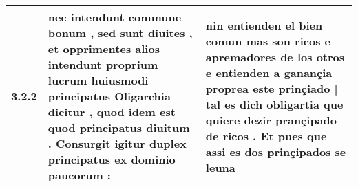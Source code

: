 \begin{tabular}{|p{1cm}|p{6.5cm}|p{6.5cm}|}

\hline
3.2.2 & nec intendunt commune bonum , sed sunt diuites , \textbf{ et opprimentes alios intendunt proprium lucrum huiusmodi principatus Oligarchia dicitur , } quod idem est quod principatus diuitum . Consurgit igitur duplex principatus ex dominio paucorum : & nin entienden el bien comun mas son ricos e apremadores de los otros \textbf{ e entienden a ganançia proprea este prinçiado | tal es dich obligartia } que quiere dezir prançipado de ricos . Et pues que assi es dos prinçipados se leuna \\\hline

\end{tabular}
